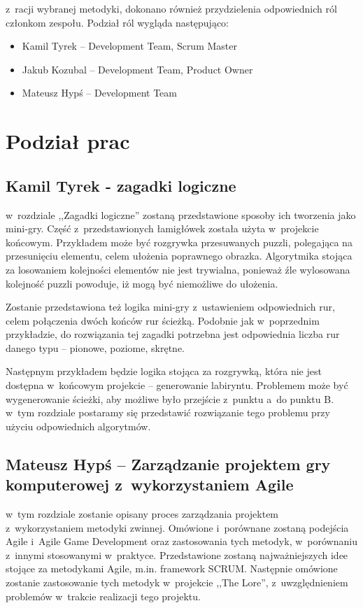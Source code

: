 \documentclass[oneside,polski,logo]{amuthesis}
\begin{document}
z~racji wybranej metodyki, dokonano również przydzielenia odpowiednich ról członkom zespołu. Podział ról wygląda następująco:

\begin{itemize}
	\item Kamil Tyrek –  Development Team, Scrum Master
	\item Jakub Kozubal –  Development Team, Product Owner
	\item Mateusz Hypś –  Development Team
\end{itemize}

\section{Podział prac}
\subsection{Kamil Tyrek - zagadki logiczne}
w~rozdziale ,,Zagadki logiczne'' zostaną przedstawione sposoby ich tworzenia jako mini-gry. Część z~przedstawionych łamigłówek została użyta w~projekcie końcowym. Przykładem może być rozgrywka przesuwanych puzzli, polegająca na przesunięciu elementu, celem ułożenia poprawnego obrazka. Algorytmika stojąca za losowaniem kolejności elementów nie jest trywialna, ponieważ źle wylosowana kolejność puzzli powoduje, iż mogą być niemożliwe do ułożenia.

Zostanie przedstawiona też logika mini-gry z~ustawieniem odpowiednich rur, celem połączenia dwóch końców rur ścieżką. Podobnie jak w~poprzednim przykładzie, do rozwiązania tej zagadki potrzebna jest odpowiednia liczba rur danego typu – pionowe, poziome, skrętne. 

Następnym przykładem będzie logika stojąca za rozgrywką, która nie jest dostępna w~końcowym projekcie – generowanie labiryntu. Problemem może być wygenerowanie ścieżki, aby możliwe było przejście z~punktu a~do punktu B. w~tym rozdziale postaramy się przedstawić rozwiązanie tego problemu przy użyciu odpowiednich algorytmów.

\subsection{Mateusz Hypś – Zarządzanie projektem gry komputerowej z~wykorzystaniem Agile}
\hfill \break
w~tym rozdziale zostanie opisany proces zarządzania projektem z~wykorzystaniem metodyki zwinnej. Omówione i~porównane zostaną podejścia Agile i~Agile Game Development oraz zastosowania tych metodyk, w~porównaniu z~innymi stosowanymi w~praktyce. Przedstawione zostaną najważniejszych idee stojące za metodykami Agile, m.in. framework SCRUM. Następnie omówione zostanie zastosowanie tych metodyk w~projekcie ,,The Lore”, z~uwzględnieniem problemów w~trakcie realizacji tego projektu. 
\end{document}
